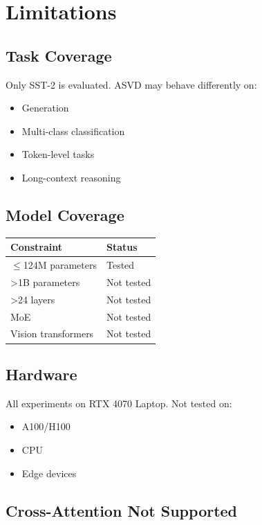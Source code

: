 
\section{Limitations}

\subsection{Task Coverage}

Only SST-2 is evaluated. ASVD may behave differently on:
\begin{itemize}
\item Generation
\item Multi-class classification
\item Token-level tasks
\item Long-context reasoning

\end{itemize}
\subsection{Model Coverage}

\begin{table}[H]
\centering
\small
\begin{tabular}{ll}
\toprule
\textbf{Constraint} & \textbf{Status} \\
\midrule
$\le$124M parameters & Tested \\
>1B parameters & Not tested \\
>24 layers & Not tested \\
MoE & Not tested \\
Vision transformers & Not tested \\
\bottomrule
\end{tabular}
\end{table}

\subsection{Hardware}

All experiments on RTX 4070 Laptop. Not tested on:
\begin{itemize}
\item A100/H100
\item CPU
\item Edge devices

\end{itemize}
\subsection{Cross-Attention Not Supported}

